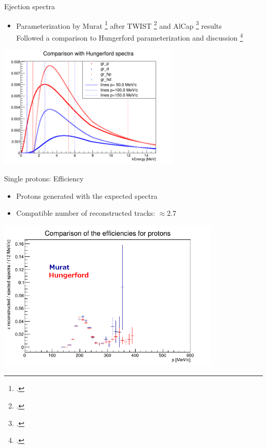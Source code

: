 \documentclass[10pt]{beamer}
\begin{document}
%
\begin{frame}{Ejection spectra}
\begin{itemize}
\item Parameterization by Murat \footcite{Pasha:spectra} after TWIST \footcite{TWIST:2020} and AlCap \footcite{AlCap:2020} results\\
{\small Followed a comparison to Hungerford parameterization and discussion \footcite{io:sobottka}}
\end{itemize}

\begin{center}
\includegraphics[width=0.65\textwidth]{mu2e_spectra_articles/comparison2}
\end{center}
\end{frame}

%
\begin{frame}{Single protons: Efficiency}
\begin{itemize}
\item Protons generated with the expected spectra
\item Compatible number of reconstructed tracks: $\approx 2.7$ \textperthousand
\end{itemize}
\begin{center}
\includegraphics[width=0.8\textwidth]{plots/ejected/proton_eff_comparison_PS}
\end{center}
\end{frame}
\end{document}

